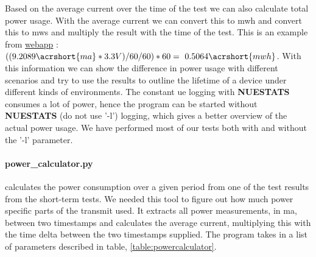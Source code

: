 \documentclass[USenglish]{ifimaster}  %
\begin{document}
Based on the average current over the time of the test we can also calculate total power usage. With the average current we can convert this to \acrshort{mwh} and convert this to \acrshort{mws} and multiply the result with the time of the test. This is an example from \href{http://158.39.77.97:9000/\#/results/UiO\_TELIA\_5.02\_precision\_2018-03-16\_1\_0x2\_60\_1\_512}{webapp} \cite{webapp:powerexample}: ${( (9.2089 \acrshort{ma} * 3.3V) / 60 / 60 ) * 60 = ~0.5064 \acrshort{mwh}}$. With this information we can show the difference in power usage with different scenarios and try to use the results to outline the lifetime of a device under different kinds of environments. The constant \acrshort{ue} logging with \textbf{NUESTATS} consumes a lot of power, hence the program can be started without \textbf{NUESTATS} (do not use '-l') logging, which gives a better overview of the actual power usage. We have performed most of our tests both with and without the '-l' parameter.

\paragraph{\textbf{power\_calculator.py}} calculates the power consumption over a given period from one of the test results from the short-term tests. We needed this tool to figure out how much power specific parts of the transmit used. It extracts all power measurements, in \acrshort{ma}, between two timestamps and calculates the average current, multiplying this with the time delta between the two timestamps supplied. The program takes in a list of parameters described in table, \vref{table:powercalculator}.

\begin{table}[H]
\centering
{}
\caption[\textbf{power\_calculator.py} parameters]{\textbf{power\_calculator.py} parameters. See \href{https://github.com/henninghaakonsen/thesis/blob/master/code/power_calculator.py}{power calculator}\cite{code:powercalc} for complete code}
\label{table:powercalculator}
\end{table}
\end{document}
